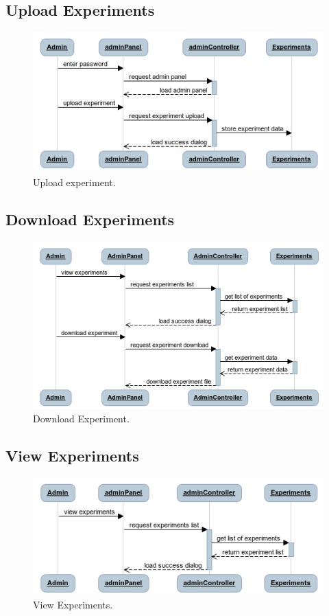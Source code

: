 \documentclass[a4paper,12pt,oneside]{report}
\begin{document}
\subsection{Upload Experiments}
\begin{figure}[!hp]
  \begin{center}
   \includegraphics[width=11.5cm]{pics/upload_experiments.png}
  \end{center}
\caption{Upload experiment.}
\end{figure}


\subsection{Download Experiments}
\begin{figure}[!hp]
  \begin{center}
   \includegraphics[width=11.5cm]{pics/download_experiments.png}
  \end{center}
\caption{Download Experiment.}
\end{figure}


\subsection{View Experiments}
\vskip 1cm
\begin{figure}[!hp]
  \begin{center}
   \includegraphics[width=11.5cm]{pics/view_experiments.png}
  \end{center}
\caption{View Experiments.}
\end{figure}
\end{document}
